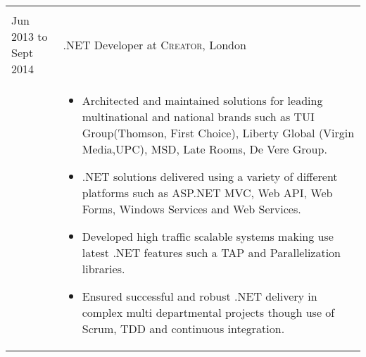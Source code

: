 \documentclass[a4paper,10pt]{article} %
\begin{document}
\begin{tabular}{ L{2cm} | L{11cm}}
    
 
 \\






Jun 2013 to Sept 2014 & .NET Developer at \textsc{Creator}, London \\

 


 
&\MPtrue	   
\begin{itemize}[leftmargin=*]
 
 
 
 
 
		\item Architected and maintained solutions for leading multinational and national brands such as TUI Group(Thomson, First Choice), Liberty Global (Virgin Media,UPC), MSD, Late Rooms, De Vere Group. 

		\item .NET solutions delivered using a variety of different platforms such as ASP.NET MVC, Web API, Web Forms, Windows Services and Web Services.
																		
		\item Developed high traffic scalable systems making use latest .NET features such a TAP and Parallelization libraries.

		\item Ensured successful and robust .NET delivery in complex multi departmental projects though use of Scrum, TDD and continuous integration.


\end{itemize}
\end{tabular}
\end{document}
